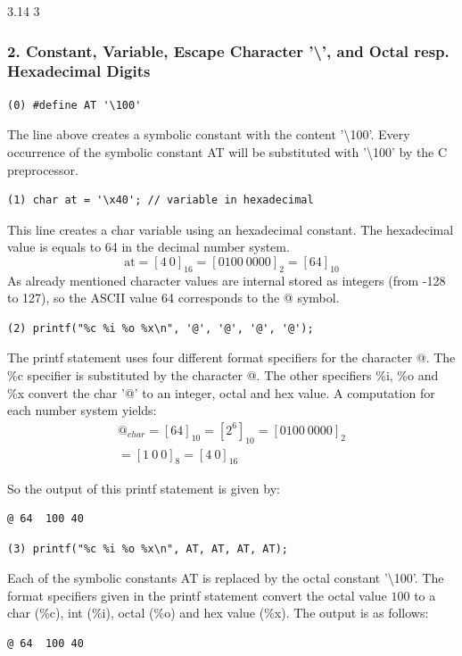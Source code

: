\documentclass[12pt]{article}
\begin{document}
3.14 3

\subsubsection*{2. Constant, Variable, Escape Character '\textbackslash', and Octal resp. Hexadecimal Digits}
\begin{lstlisting}
(0) #define AT '\100'
\end{lstlisting}
The line above creates a symbolic constant with the content '\textbackslash 100'.
Every occurrence of the symbolic constant AT will be substituted with '\textbackslash 100' by the C preprocessor.

\begin{lstlisting}
(1) char at = '\x40'; // variable in hexadecimal
\end{lstlisting}
This line creates a char variable using an hexadecimal constant. The hexadecimal value is equals to 64 in the decimal number system.
\begin{equation}
\text{at} = [4 \: 0]_{16} = [0100 \: 0000]_2 =  [64]_{10}
\end{equation} 
As already mentioned character values are internal stored as integers (from -128 to 127), so the ASCII value 64 corresponds to the @ symbol.
\\
\begin{lstlisting}
(2) printf("%c %i %o %x\n", '@', '@', '@', '@');
\end{lstlisting}
The printf statement uses four different format specifiers for the character @.
The \%c specifier is substituted by the character @. The other specifiers \%i, \%o and \%x convert the char '@' to an integer, octal and hex value. 
A computation for each number system yields:
\begin{equation}
\begin{split}
@_{char} = {[64]}_{10} = {[2^6]}_{10} = {[0100 \: 0000]}_2 \\
= [1 \: 0 \: 0]_{8} =[4 \: 0]_{16}
\end{split}
\end{equation}

So the output of this printf statement is given by:

\begin{lstlisting}
@ 64  100 40
\end{lstlisting}


\begin{lstlisting}
(3) printf("%c %i %o %x\n", AT, AT, AT, AT);
\end{lstlisting}
Each of the symbolic constants AT is replaced by the octal constant '\textbackslash 100'. The format specifiers given in the printf statement convert the octal value $100$ to a char (\%c), int (\%i), octal (\%o) and hex value (\%x). 
The output is as follows:
\begin{lstlisting}
@ 64  100 40
\end{lstlisting}
\end{document}
